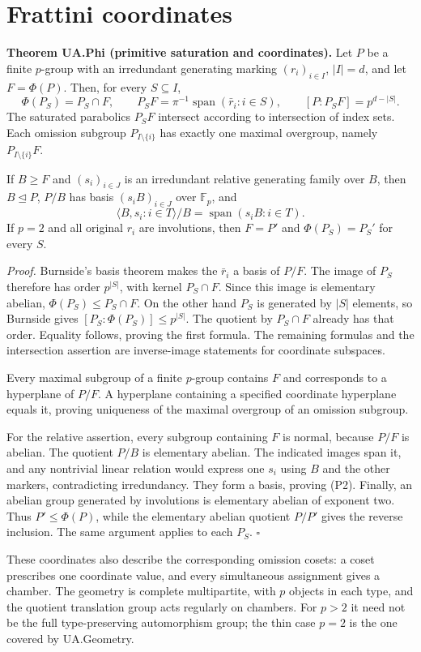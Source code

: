 \section{Frattini coordinates}\label{frattini-coordinates}

\textbf{Theorem UA.Phi (primitive saturation and coordinates).} Let
\(P\) be a finite \(p\)-group with an irredundant generating marking
\((r_i)_{i\in I}\), \(|I|=d\), and let \(F=\Phi(P)\). Then, for every
\(S\subseteq I\), \[
\Phi(P_S)=P_S\cap F,\qquad
P_SF=\pi^{-1}\operatorname{span}(\bar r_i:i\in S),\qquad
[P:P_SF]=p^{d-|S|}.
\tag{P1}
\] The saturated parabolics \(P_SF\) intersect according to intersection
of index sets. Each omission subgroup \(P_{I\setminus\{i\}}\) has
exactly one maximal overgroup, namely \(P_{I\setminus\{i\}}F\).

If \(B\geq F\) and \((s_i)_{i\in J}\) is an irredundant relative
generating family over \(B\), then \(B\unlhd P\), \(P/B\) has basis
\((s_iB)_{i\in J}\) over \(\mathbb F_p\), and \[
\langle B,s_i:i\in T\rangle/B=\operatorname{span}(s_iB:i\in T).
\tag{P2}
\] If \(p=2\) and all original \(r_i\) are involutions, then \(F=P'\)
and \(\Phi(P_S)=P_S'\) for every \(S\).

\emph{Proof.} Burnside's basis theorem makes the \(\bar r_i\) a basis of
\(P/F\). The image of \(P_S\) therefore has order \(p^{|S|}\), with
kernel \(P_S\cap F\). Since this image is elementary abelian,
\(\Phi(P_S)\leq P_S\cap F\). On the other hand \(P_S\) is generated by
\(|S|\) elements, so Burnside gives \([P_S:\Phi(P_S)]\leq p^{|S|}\). The
quotient by \(P_S\cap F\) already has that order. Equality follows,
proving the first formula. The remaining formulas and the intersection
assertion are inverse-image statements for coordinate subspaces.

Every maximal subgroup of a finite \(p\)-group contains \(F\) and
corresponds to a hyperplane of \(P/F\). A hyperplane containing a
specified coordinate hyperplane equals it, proving uniqueness of the
maximal overgroup of an omission subgroup.

For the relative assertion, every subgroup containing \(F\) is normal,
because \(P/F\) is abelian. The quotient \(P/B\) is elementary abelian.
The indicated images span it, and any nontrivial linear relation would
express one \(s_i\) using \(B\) and the other markers, contradicting
irredundancy. They form a basis, proving (P2). Finally, an abelian group
generated by involutions is elementary abelian of exponent two. Thus
\(P'\leq\Phi(P)\), while the elementary abelian quotient \(P/P'\) gives
the reverse inclusion. The same argument applies to each \(P_S\).
\(\square\)

These coordinates also describe the corresponding omission cosets: a
coset prescribes one coordinate value, and every simultaneous assignment
gives a chamber. The geometry is complete multipartite, with \(p\)
objects in each type, and the quotient translation group acts regularly
on chambers. For \(p>2\) it need not be the full type-preserving
automorphism group; the thin case \(p=2\) is the one covered by
UA.Geometry.
